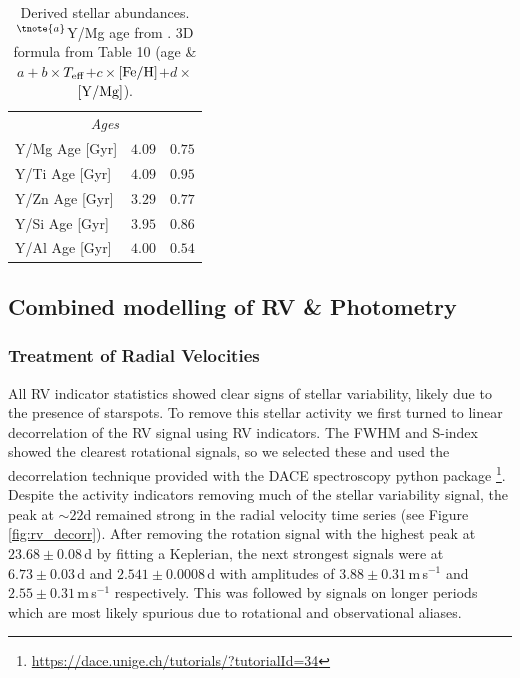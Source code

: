 \documentclass[fleqn,usenatbib]{mnras}
\newcommand{\ms}{m\,s$^{-1}$}
\newcommand{\teff}{$T_{\rm eff}$}
\newcommand{\feh}{\mbox{$\rm [Fe/H]$}}
\newcommand{\ymg}{\mbox{$\rm [Y/Mg]$}}
\begin{document}
\begin{table}
\begin{tabular}{lcc}
        \hline
        \multicolumn{3}{c}{\it Ages}\\
        Y/Mg Age [Gyr]  & $ 4.09 $ & $ 0.75 $ \\
        Y/Ti Age [Gyr]  & $ 4.09 $ & $ 0.95 $ \\
        Y/Zn Age [Gyr]  & $ 3.29 $ & $ 0.77 $ \\
        Y/Si Age [Gyr]  & $ 3.95 $ & $ 0.86 $ \\
        Y/Al Age [Gyr]  & $ 4.00 $ & $ 0.54 $ \\
        \hline
        \hline
    \end{tabular}
    \caption{Derived stellar abundances. $^{\tnote{a}}$Y/Mg age from \citet{Delgado-19}. 3D formula from Table 10 (age \&  $a + b \times$\teff{}$+ c \times$\feh{}$ + d \times$\ymg{}).}
    \label{tab:abunds}
\end{table}


\subsection{Combined modelling of RV \& Photometry}

\subsubsection{Treatment of Radial Velocities}
All RV indicator statistics showed clear signs of stellar variability, likely due to the presence of starspots.
To remove this stellar activity we first turned to linear decorrelation of the RV signal using RV indicators.
The FWHM and S-index showed the clearest rotational signals, so we selected these and used the decorrelation technique provided with the DACE spectroscopy python package \citep{2015ASPC..495....7B}\footnote{\url{https://dace.unige.ch/tutorials/?tutorialId=34}}.
Despite the activity indicators removing much of the stellar variability signal, the peak at $\sim22$d remained strong in the radial velocity time series (see Figure \ref{fig:rv_decorr}).
After removing the rotation signal with the highest peak at $23.68\pm0.08$\,d by fitting a Keplerian, the next strongest signals were at $6.73\pm0.03$\,d and $2.541\pm0.0008$\,d with amplitudes of $3.88\pm0.31$\,\ms{} and $2.55\pm0.31$\,\ms{} respectively. This was followed by signals on longer periods which are most likely spurious due to rotational and observational aliases.
\end{document}
